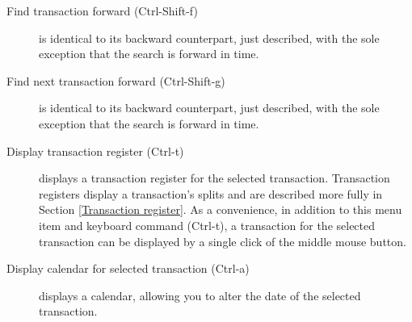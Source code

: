 \documentclass{report}
\begin{document}
\begin{description}
\item [Find transaction forward (Ctrl-Shift-f)] is identical to its backward counterpart, just described, with the sole exception that the search is forward in time.
\item [Find next transaction forward (Ctrl-Shift-g)] is identical to its backward counterpart, just described, with the sole exception that the search is forward in time.
\item [Display transaction register (Ctrl-t)] displays a transaction register for the selected transaction. Transaction registers display a transaction's splits and are described more fully in Section \ref{Transaction register}. As a convenience, in addition to this menu item and keyboard command (Ctrl-t), a transaction for the selected transaction can be displayed by a single click of the middle mouse button.
\item [Display calendar for selected transaction (Ctrl-a)] displays a calendar, allowing you to alter the date of the selected transaction. 


\end{description}
\end{document}
